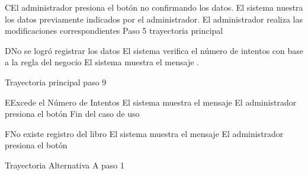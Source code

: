 		\begin{UCtrayectoriaA}{C}{El administrador presiona el botón  no confirmando los datos.}
			\UCpaso[\UCsist] El sistema nuestra los datos previamente indicados por el administrador.
			\UCpaso[\UCactor] El administrador realiza las modificaciones correspondientes 
			Paso 5 trayectoria principal 
		\end{UCtrayectoriaA}

		\begin{UCtrayectoriaA}{D}{No se logró registrar los datos }
			\UCpaso[\UCsist] El sistema verifica el número de intentos con base a la regla del negocio 
			\UCpaso[\UCsist] El sistema muestra el mensaje .

			Trayectoria principal paso 9
		\end{UCtrayectoriaA}
	
		\begin{UCtrayectoriaA}{E}{Excede el Número de Intentos}
			\UCpaso[\UCsist] El sistema muestra el mensaje 
			\UCpaso[\UCactor]El administrador presiona el botón  
			Fin del caso de uso 
		\end{UCtrayectoriaA}

		\begin{UCtrayectoriaA}{F}{No existe registro del libro  }
			\UCpaso[\UCsist] El sistema muestra el mensaje 
			\UCpaso[\UCactor]El administrador presiona el botón  

			Trayectoria Alternativa A paso 1  
		\end{UCtrayectoriaA}
				
